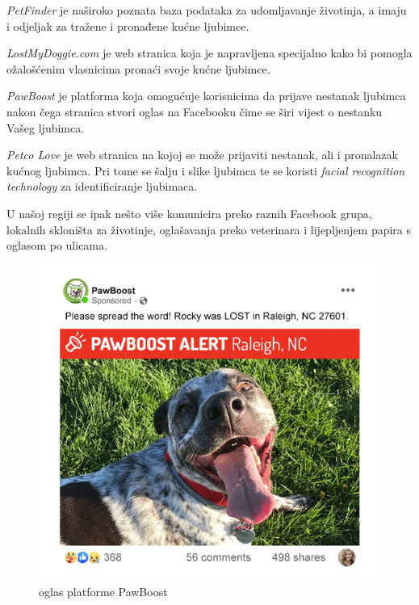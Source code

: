 		\begin{packed_item}		
		
			\item \textit{PetFinder} je naširoko poznata baza podataka za udomljavanje životinja, a imaju i odjeljak za tražene i pronađene kućne ljubimce.
		
			\item \textit{LostMyDoggie.com} je web stranica koja je napravljena specijalno kako bi pomogla ožalošćenim vlasnicima pronaći svoje kućne ljubimce.
		
			\item \textit{PawBoost} je platforma koja omogućuje korisnicima da prijave nestanak ljubimca nakon čega stranica stvori oglas na Facebooku čime se širi vijest o nestanku Vašeg ljubimca.
		
			\item \textit{Petco Love} je web stranica na kojoj se može prijaviti nestanak, ali i pronalazak kućnog ljubimca. Pri tome se šalju i slike ljubimca te se koristi \textit{facial recognition technology} za identificiranje ljubimaca.
		
		\end{packed_item}
		
		U našoj regiji se ipak nešto više komunicira preko raznih Facebook grupa, lokalnih skloništa za životinje, oglašavanja preko veterinara i lijepljenjem papira s oglasom po ulicama.\\
		
		\begin{figure}[H]
			\includegraphics[scale=0.5]{slike/pawBoost.PNG} 
			\centering
			\caption{oglas platforme PawBoost}
			\label{pawBoost}
		\end{figure}
		
